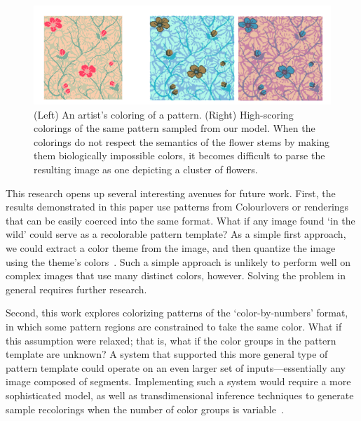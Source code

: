 
\begin{figure}
\centering
\includegraphics[width=0.7\columnwidth]{figs/badFlowers}
\caption{(Left) An artist's coloring of a pattern. (Right) High-scoring colorings of the same pattern sampled from our model. When the colorings do not respect the semantics of the flower stems by making them biologically impossible colors, it becomes difficult to parse the resulting image as one depicting a cluster of flowers.}
\label{fig:badFlowers}
\end{figure}


This research opens up several interesting avenues for future work.
First, the results demonstrated in this paper use patterns from Colourlovers or renderings that can be easily coerced into the same format. What if any image found `in the wild' could serve as a recolorable pattern template? As a simple first approach, we could extract a color theme from the image, and then quantize the image using the theme's colors~\cite{SharonPaletteExtraction}. Such a simple approach is unlikely to perform well on complex images that use many distinct colors, however. Solving the problem in general requires further research.

Second, this work explores colorizing patterns of the `color-by-numbers' format, in which some pattern regions are constrained to take the same color. What if this assumption were relaxed; that is, what if the color groups in the pattern template are unknown? A system that supported this more general type of pattern template could operate on an even larger set of inputs---essentially any image composed of segments. Implementing such a system would require a more sophisticated model, as well as transdimensional inference techniques to generate sample recolorings when the number of color groups is variable~\cite{ReversibleJumpMCMC}.

